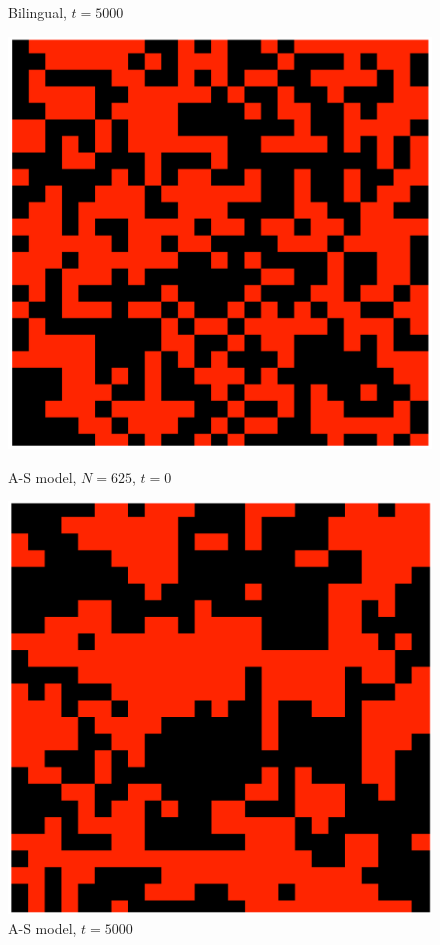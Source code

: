 \begin{figure}[h]
\begin{minipage}[t]{0.43\linewidth}
    \caption{\scriptsize Bilingual, \(t=5000\)}
    \label{reg_net_bi2}
\end{minipage}
\vspace{-5pt}
\begin{minipage}[t]{0.43\linewidth}
    \centering
    \includegraphics[width=\textwidth]{images/task29/regular_net_Str_t=1.png} 
    \caption{\scriptsize A-S model, \(N=625\), \(t=0\)}
    \label{reg_net_Str1}
\end{minipage}
\hfill
\begin{minipage}[t]{0.43\linewidth}
    \centering
    \includegraphics[width=\textwidth]{images/task29/regular_net_Str_t=5000.png} 
    \caption{\scriptsize A-S model, \(t=5000\)}
    \label{reg_net_Str2}
\end{minipage}
\end{figure}
